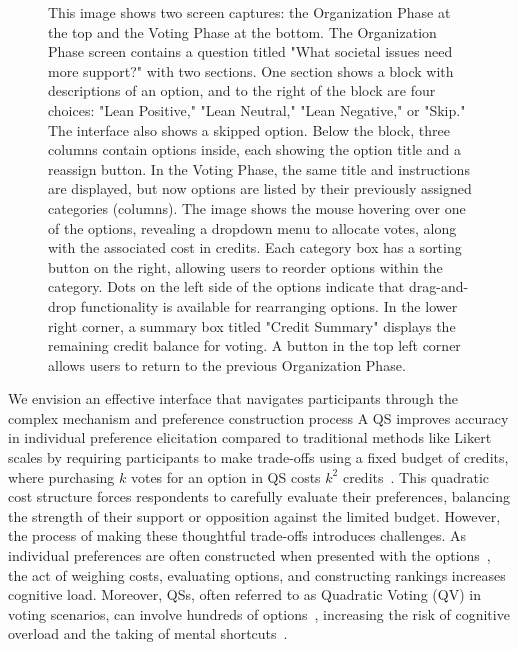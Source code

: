\begin{figure}[p]
{    This image shows two screen captures: the Organization Phase at the top and the Voting Phase at the bottom. The Organization Phase screen contains a question titled "What societal issues need more support?" with two sections. One section shows a block with descriptions of an option, and to the right of the block are four choices: "Lean Positive," "Lean Neutral," "Lean Negative," or "Skip." The interface also shows a skipped option. Below the block, three columns contain options inside, each showing the option title and a reassign button. In the Voting Phase, the same title and instructions are displayed, but now options are listed by their previously assigned categories (columns). The image shows the mouse hovering over one of the options, revealing a dropdown menu to allocate votes, along with the associated cost in credits. Each category box has a sorting button on the right, allowing users to reorder options within the category. Dots on the left side of the options indicate that drag-and-drop functionality is available for rearranging options. In the lower right corner, a summary box titled "Credit Summary" displays the remaining credit balance for voting. A button in the top left corner allows users to return to the previous Organization Phase.
    }

\end{figure}

We envision an effective interface that navigates participants through the complex mechanism and preference construction process A QS improves accuracy in individual preference elicitation compared to traditional methods like Likert scales by requiring participants to make trade-offs using a fixed budget of credits, where purchasing $k$ votes for an option in QS costs $k^2$ credits~\cite{quarfoot2017quadratic,chengCanShowWhat2021}. This quadratic cost structure forces respondents to carefully evaluate their preferences, balancing the strength of their support or opposition against the limited budget. However, the process of making these thoughtful trade-offs introduces challenges. As individual preferences are often constructed when presented with the options~\cite{lichtensteinConstructionPreference2006}, the act of weighing costs, evaluating options, and constructing rankings increases cognitive load. Moreover, QSs, often referred to as Quadratic Voting (QV) in voting scenarios, can involve hundreds of options~\cite{rogersColoradoTriedNew2019, teamTaiwanDigitalMinister}, increasing the risk of cognitive overload and the taking of mental shortcuts~\cite{simonBehavioralModelRational1955, payneAdaptiveStrategySelection1988, tverskyJudgmentsRepresentativeness}.

